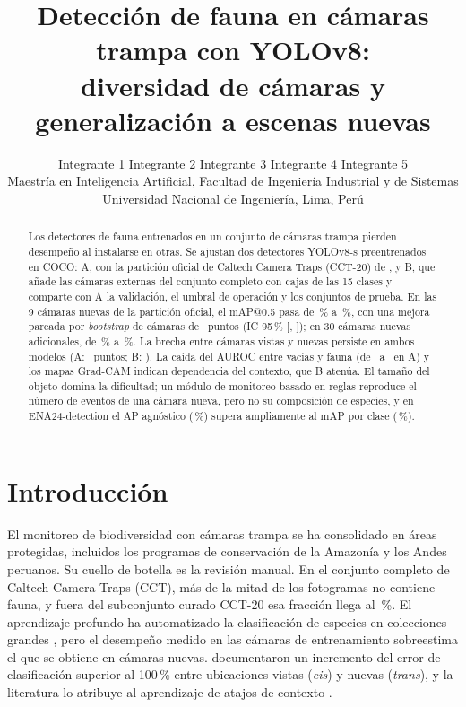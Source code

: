 \documentclass{article}
\title{Detección de fauna en cámaras trampa con YOLOv8:\\ diversidad de cámaras y generalización a escenas nuevas}
\author{%
  Integrante 1 \quad Integrante 2 \quad Integrante 3 \quad Integrante 4 \quad Integrante 5\\
  Maestría en Inteligencia Artificial, Facultad de Ingeniería Industrial y de Sistemas\\
  Universidad Nacional de Ingeniería, Lima, Perú
}
\begin{document}
\maketitle

\begin{abstract}
Los detectores de fauna entrenados en un conjunto de cámaras trampa pierden desempeño al instalarse en otras. Se ajustan dos detectores YOLOv8-s preentrenados en COCO: A, con la partición oficial de Caltech Camera Traps (CCT-20) de \textcite{beery2018}, y B, que añade las cámaras externas del conjunto completo con cajas de las 15 clases y comparte con A la validación, el umbral de operación y los conjuntos de prueba. En las 9 cámaras nuevas de la partición oficial, el mAP@0.5 pasa de \mapTransCincA\,\% a \mapTransCincB\,\%, con una mejora pareada por \emph{bootstrap} de cámaras de \mejoraTrans\ puntos (IC 95\,\% [\icMejoraTransLo, \icMejoraTransHi]); en 30 cámaras nuevas adicionales, de \mapExtCincA\,\% a \mapExtCincB\,\%. La brecha entre cámaras vistas y nuevas persiste en ambos modelos (A: \brechaTransA\ puntos; B: \brechaTransB). La caída del AUROC entre vacías y fauna (de \aucCisA\ a \aucExtA\ en A) y los mapas Grad-CAM indican dependencia del contexto, que B atenúa. El tamaño del objeto domina la dificultad; un módulo de monitoreo basado en reglas reproduce el número de eventos de una cámara nueva, pero no su composición de especies, y en ENA24-detection el AP agnóstico (\agnEnaB\,\%) supera ampliamente al mAP por clase (\mapEnaCincB\,\%).
\end{abstract}

\section{Introducción}
\label{sec:intro}
El monitoreo de biodiversidad con cámaras trampa se ha consolidado en áreas protegidas, incluidos los programas de conservación de la Amazonía y los Andes peruanos. Su cuello de botella es la revisión manual. En el conjunto completo de Caltech Camera Traps (CCT), más de la mitad de los fotogramas no contiene fauna, y fuera del subconjunto curado CCT-20 esa fracción llega al \pctVaciasExtTrain\,\%. El aprendizaje profundo ha automatizado la clasificación de especies en colecciones grandes \parencite{norouzzadeh2018,tabak2019}, pero el desempeño medido en las cámaras de entrenamiento sobreestima el que se obtiene en cámaras nuevas. \Textcite{beery2018} documentaron un incremento del error de clasificación superior al 100\,\% entre ubicaciones vistas (\emph{cis}) y nuevas (\emph{trans}), y la literatura lo atribuye al aprendizaje de atajos de contexto \parencite{geirhos2020,ribeiro2016}.
\end{document}
